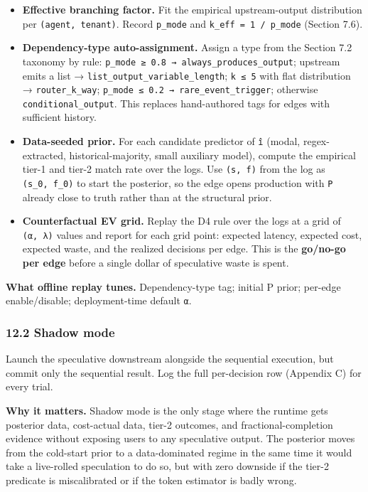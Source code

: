 \documentclass[
  11pt,
]{article}
\providecommand{\tightlist}{%
  \setlength{\itemsep}{0pt}\setlength{\parskip}{0pt}}
\begin{document}
\begin{itemize}
\tightlist
\item
  \textbf{Effective branching factor.} Fit the empirical upstream-output
  distribution per \texttt{(agent,\ tenant)}. Record \texttt{p\_mode}
  and \texttt{k\_eff\ =\ 1\ /\ p\_mode} (Section 7.6).
\item
  \textbf{Dependency-type auto-assignment.} Assign a type from the
  Section 7.2 taxonomy by rule:
  \texttt{p\_mode\ ≥\ 0.8\ →\ always\_produces\_output}; upstream emits
  a list → \texttt{list\_output\_variable\_length}; \texttt{k\ ≤\ 5}
  with flat distribution → \texttt{router\_k\_way};
  \texttt{p\_mode\ ≤\ 0.2\ →\ rare\_event\_trigger}; otherwise
  \texttt{conditional\_output}. This replaces hand-authored tags for
  edges with sufficient history.
\item
  \textbf{Data-seeded prior.} For each candidate predictor of \texttt{î}
  (modal, regex-extracted, historical-majority, small auxiliary model),
  compute the empirical tier-1 and tier-2 match rate over the logs. Use
  \texttt{(s,\ f)} from the log as \texttt{(s\_0,\ f\_0)} to start the
  posterior, so the edge opens production with \texttt{P} already close
  to truth rather than at the structural prior.
\item
  \textbf{Counterfactual EV grid.} Replay the D4 rule over the logs at a
  grid of \texttt{(α,\ λ)} values and report for each grid point:
  expected latency, expected cost, expected waste, and the realized
  decisions per edge. This is the \textbf{go/no-go per edge} before a
  single dollar of speculative waste is spent.
\end{itemize}

\textbf{What offline replay tunes.} Dependency-type tag; initial P
prior; per-edge enable/disable; deployment-time default \texttt{α}.

\subsubsection{12.2 Shadow mode}\label{shadow-mode}

Launch the speculative downstream alongside the sequential execution,
but commit only the sequential result. Log the full per-decision row
(Appendix C) for every trial.

\textbf{Why it matters.} Shadow mode is the only stage where the runtime
gets posterior data, cost-actual data, tier-2 outcomes, and
fractional-completion evidence without exposing users to any speculative
output. The posterior moves from the cold-start prior to a
data-dominated regime in the same time it would take a live-rolled
speculation to do so, but with zero downside if the tier-2 predicate is
miscalibrated or if the token estimator is badly wrong.
\end{document}
